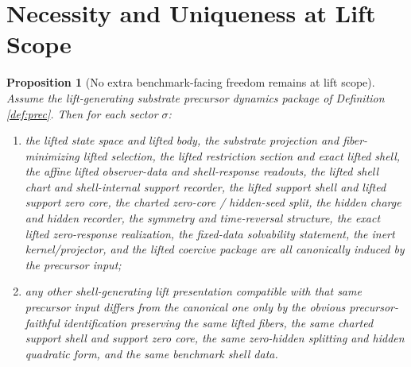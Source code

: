\documentclass[11pt]{article}
\newtheorem{proposition}{Proposition}
\begin{document}
\section{Necessity and Uniqueness at Lift Scope}

\begin{proposition}[No extra benchmark-facing freedom remains at lift scope]
\label{prop:unique}
Assume the lift-generating substrate precursor dynamics package of Definition \ref{def:prec}. Then for each sector \(\sigma\):
\begin{enumerate}
    \item the lifted state space and lifted body, the substrate projection and fiber-minimizing lifted selection, the lifted restriction section and exact lifted shell, the affine lifted observer-data and shell-response readouts, the lifted shell chart and shell-internal support recorder, the lifted support shell and lifted support zero core, the charted zero-core / hidden-seed split, the hidden charge and hidden recorder, the symmetry and time-reversal structure, the exact lifted zero-response realization, the fixed-data solvability statement, the inert kernel/projector, and the lifted coercive package are all canonically induced by the precursor input;
    \item any other shell-generating lift presentation compatible with that same precursor input differs from the canonical one only by the obvious precursor-faithful identification preserving the same lifted fibers, the same charted support shell and support zero core, the same zero-hidden splitting and hidden quadratic form, and the same benchmark shell data.
\end{enumerate}
\end{proposition}
\end{document}
